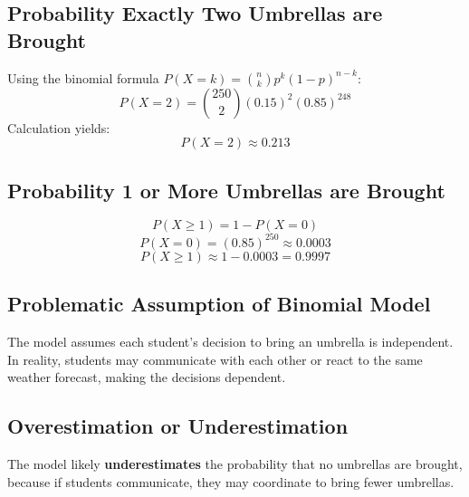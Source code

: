 \documentclass{article}
\begin{document}
\subsection{Probability Exactly Two Umbrellas are Brought}
Using the binomial formula \( P(X = k) = \binom{n}{k} p^k (1-p)^{n-k} \):
\[
P(X = 2) = \binom{250}{2} (0.15)^2 (0.85)^{248}
\]
Calculation yields:
\[
P(X = 2) \approx 0.213
\]

\subsection{Probability 1 or More Umbrellas are Brought}
\[
P(X \geq 1) = 1 - P(X = 0)
\]
\[
P(X = 0) = (0.85)^{250} \approx 0.0003
\]
\[
P(X \geq 1) \approx 1 - 0.0003 = 0.9997
\]

\subsection{Problematic Assumption of Binomial Model}
The model assumes each student’s decision to bring an umbrella is independent. In reality, students may communicate with each other or react to the same weather forecast, making the decisions dependent.

\subsection{Overestimation or Underestimation}
The model likely \textbf{underestimates} the probability that no umbrellas are brought, because if students communicate, they may coordinate to bring fewer umbrellas.
\end{document}
